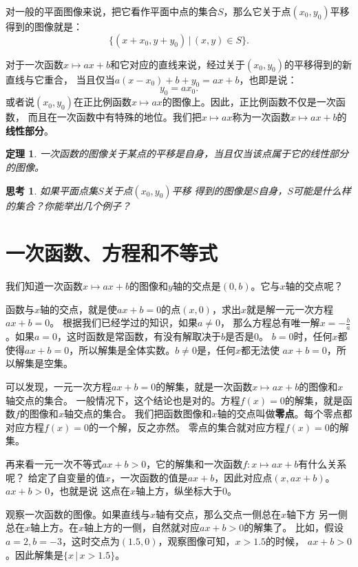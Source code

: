 \documentclass[12pt,UTF8]{ctexbook}
\newtheorem{tm}{定理}[section]
\newtheorem{sk}{思考}[section]
\begin{document}
对一般的平面图像来说，把它看作平面中点的集合$S$，那么它关于点$(x_0, y_0)$平移
得到的图像就是：
$$\{(x+x_0, y+y_0) \,|\, (x,y)\in S \}.$$

对于一次函数$x\mapsto ax+b$和它对应的直线来说，经过关于$(x_0, y_0)$的平移得到的新直线与它重合，
当且仅当$a(x-x_0)+b+y_0 = ax + b$，也即是说：
$$ y_0 = ax_0.$$
或者说$(x_0, y_0)$在正比例函数$x\mapsto ax$的图像上。因此，正比例函数不仅是一次函数，
而且在一次函数中有特殊的地位。我们把$x\mapsto ax$称为一次函数$x\mapsto ax+b$的\textbf{线性部分}。

\begin{tm}\label{tm:5-2-0}
    一次函数的图像关于某点的平移是自身，当且仅当该点属于它的线性部分的图像。
\end{tm}

\begin{sk}\label{sk:5-2-0}
    如果平面点集$S$关于点$(x_0, y_0)$平移
    得到的图像是$S$自身，$S$可能是什么样的集合？你能举出几个例子？
\end{sk}

\section{一次函数、方程和不等式}
我们知道一次函数$x\mapsto ax + b$的图像和$y$轴的交点是$(0, b)$。它与$x$轴的交点呢？

函数与$x$轴的交点，就是使$ax + b = 0$的点$(x, 0)$，求出$x$就是解一元一次方程$ax + b = 0$。
根据我们已经学过的知识，如果$a\neq 0$，
那么方程总有唯一解$x= -\frac{b}{a}$。如果$a = 0$，这时函数是常函数，有没有解取决于$b$是否是$0$。
$b = 0$时，任何$x$都使得$ax + b = 0$，所以解集是全体实数。$b \neq 0$是，任何$x$都无法使
$ax + b = 0$，所以解集是空集。

可以发现，一元一次方程$ax + b = 0$的解集，就是一次函数$x\mapsto ax + b$的图像和$x$轴交点的集合。
一般情况下，这个结论也是对的。方程$f(x) = 0$的解集，就是函数$f$的图像和$x$轴交点的集合。
我们把函数图像和$x$轴的交点叫做\textbf{零点}。每个零点都对应方程$f(x) = 0$的一个解，反之亦然。
零点的集合就对应方程$f(x) = 0$的解集。

再来看一元一次不等式$ax + b > 0$，它的解集和一次函数$f:x\mapsto ax + b$有什么关系呢？
给定了自变量的值$x$，一次函数的值是$ax + b$，因此对应点$(x, ax + b)$。$ax + b > 0$，也就是说
这点在$x$轴上方，纵坐标大于$0$。

观察一次函数的图像。如果直线与$x$轴有交点，那么交点一侧总在$x$轴下方
另一侧总在$x$轴上方。在$x$轴上方的一侧，自然就对应$ax + b > 0$的解集了。
比如，假设$a = 2, b = -3$，这时交点为$(1.5, 0)$，观察图像可知，$x > 1.5$的时候，
$ax + b > 0$。因此解集是$\{x \, | \, x > 1.5\}$。
\end{document}
